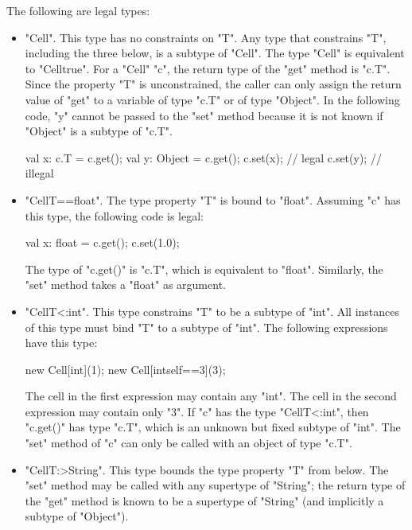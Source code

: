 The following are legal types:
\begin{itemize}
\item \xcd"Cell".  This type has no constraints on \xcd"T".
Any type that constrains \xcd"T", including the three below,
is a subtype of \xcd"Cell".  The type \xcd"Cell" is equivalent to
\xcd"Cell{true}".
%
For a \xcd"Cell" \xcd"c", the return type of the \xcd"get" method 
is \xcd"c.T".  
Since the property \xcd"T" is unconstrained,  
the caller can only assign the return value of \xcd"get"
to a variable of type \xcd"c.T" or of type \xcd"Object".
In the following code, \xcd"y" cannot be passed to the \xcd"set" method
because it is not known if \xcd"Object" is a subtype of \xcd"c.T".
\begin{xten}
val x: c.T = c.get();
val y: Object = c.get();
c.set(x); // legal
c.set(y); // illegal
\end{xten}

\item \xcd"Cell{T==float}".
The type property \xcd"T" is bound to \xcd"float".
Assuming \xcd"c" has this type, the following code is legal:
\begin{xten}
val x: float = c.get();
c.set(1.0);
\end{xten}
The type of \xcd"c.get()" is \xcd"c.T", which is equivalent to
\xcd"float".
Similarly, the \xcd"set" method takes a \xcd"float" as argument.

\item \xcd"Cell{T<:int}".
This type constrains \xcd"T" to be a subtype of \xcd"int".
All instances of this type must bind \xcd"T" to a subtype of \xcd"int".
The following expressions have this type:
\begin{xten}
new Cell[int](1);
new Cell[int{self==3}](3);
\end{xten}
The cell in the first expression may contain any \xcd"int".
The cell in the second expression may contain only \xcd"3".
%
If \xcd"c" has the type \xcd"Cell{T<:int}",
then \xcd"c.get()" has type \xcd"c.T", which is an unknown but
fixed subtype of \xcd"int".  The \xcd"set" method of \xcd"c" can
only be called with an object of type \xcd"c.T".

\item \xcd"Cell{T:>String}".  This type bounds the type property
\xcd"T"
from below.  The \xcd"set" method may be called with any
supertype of \xcd"String"; the return type of the \xcd"get"
method is known to be a
supertype of \xcd"String" (and implicitly a subtype of \xcd"Object").
\end{itemize}

